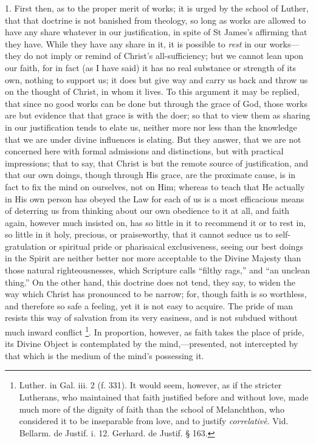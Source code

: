 1. First then, as to the proper merit of works; it is urged by the
school of Luther, that that doctrine is not banished from theology, so
long as works are allowed to have any share whatever in our
justification, in spite of St James's affirming that they have. While
they have any share in it, it is possible to \emph{rest} in our works—they
do not imply or remind of Christ's all-sufficiency; but we cannot lean
upon our faith, for in fact (as I have said) it has no real substance
or strength of its own, nothing to support us; it does but give way
and carry us back and throw us on the thought of Christ, in whom it
lives. To this argument it may be replied, that since no good works
can be done but through the grace of God, those works are but evidence
that that grace is with the doer; so that to view them as sharing
in our justification tends to elate us, neither more nor less than the
knowledge that we are under divine influences is elating. But they
answer, that we are not concerned here with formal admissions and
distinctions, but with practical impressions; that to say, that Christ
is but the remote source of justification, and that our own doings,
though through His grace, are the proximate cause, is in fact to fix
the mind on ourselves, not on Him; whereas to teach that He actually
in His own person has obeyed the Law for each of us is a most
efficacious means of deterring us from thinking about our own
obedience to it at all, and faith again, however much insisted on, has
so little in it to recommend it or to rest in, so little in it holy,
precious, or praiseworthy, that it cannot seduce us to self-gratulation
or spiritual pride or pharisaical exclusiveness, seeing our best
doings in the Spirit are neither better nor more acceptable to the
Divine Majesty than those natural righteousnesses, which Scripture
calls ``filthy rags,'' and ``an unclean thing.'' On
the other hand, this doctrine does not tend, they say, to widen the
way which Christ has pronounced to be narrow; for, though faith is so
worthless, and therefore so safe a feeling, yet it is not easy to
acquire. The pride of man resists this way of salvation from its very
easiness, and is not subdued without much inward conflict \footnote{Luther. in
Gal. iii. 2 (f. 331). It would seem, however, as if the stricter
Lutherans, who maintained that faith justified before and without
love, made much more of the dignity of faith than the school of
Melanchthon, who considered it to be inseparable from love, and to
justify \emph{correlativè}. Vid. Bellarm. de Justif. i. 12. Gerhard.
de Justif. § 163.}.
In proportion, however, as faith takes the place of pride, its
Divine Object is contemplated by the mind,—presented, not
intercepted by that which is the medium of the mind's possessing it.

